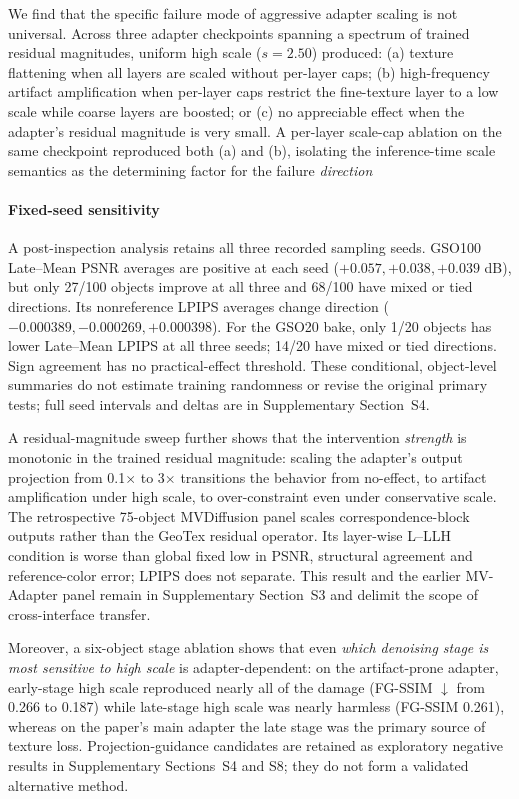 \documentclass[times,twocolumn,final]{elsarticle}
\providecommand{\DIFadd}[1]{{\protect\color{blue} \sf #1}} %
\providecommand{\DIFdel}[1]{{\protect\color{red} \scriptsize #1}} %
\providecommand{\DIFaddbegin}{} %
\providecommand{\DIFaddend}{} %
\providecommand{\DIFdelbegin}{} %
\providecommand{\DIFdelend}{} %
\begin{document}
\DIFdelbegin \DIFdel{We find that the specific failure mode of aggressive adapter scaling is not universal. Across three adapter checkpoints spanning a spectrum of trained residual magnitudes, uniform high scale ($s = 2.50$) produced: (a) texture flattening when all layers are scaled without per-layer caps; (b) high-frequency artifact amplification when per-layer caps restrict the fine-texture layer to a low scale while coarse layers are boosted; or (c) no appreciable effect when the adapter's residual magnitude is very small. A per-layer scale-cap ablation on the same checkpoint reproduced both (a) and (b), isolating the inference-time scale semantics as the determining factor for the failure \emph{direction}}\DIFdelend \DIFaddbegin \paragraph{Fixed-seed sensitivity}
\DIFadd{A post-inspection analysis retains all three recorded sampling seeds. GSO100 Late--Mean PSNR averages are positive at each seed ($+0.057,+0.038,+0.039$ dB), but only 27/100 objects improve at all three and 68/100 have mixed or tied directions. Its nonreference LPIPS averages change direction ($-0.000389,-0.000269,+0.000398$). For the GSO20 bake, only 1/20 objects has lower Late--Mean LPIPS at all three seeds; 14/20 have mixed or tied directions. Sign agreement has no practical-effect threshold. These conditional, object-level summaries do not estimate training randomness or revise the original primary tests; full seed intervals and deltas are in Supplementary Section~S4}\DIFaddend .

\DIFdelbegin \DIFdel{A residual-magnitude sweep further shows that the intervention \emph{strength} is monotonic in the trained residual magnitude: scaling the adapter's output projection from 0.1$\times$ to 3$\times$ transitions the behavior from no-effect, to artifact amplification under high scale, to over-constraint even under conservative scale.
}\DIFdelend \DIFaddbegin \DIFadd{The retrospective 75-object MVDiffusion panel scales correspondence-block outputs rather than the GeoTex residual operator. Its layer-wise L--LLH condition is worse than global fixed low in PSNR, structural agreement and reference-color error; LPIPS does not separate. This result and the earlier MV-Adapter panel remain in Supplementary Section~S3 and delimit the scope of cross-interface transfer.
}\DIFaddend

\DIFdelbegin \DIFdel{Moreover, a six-object stage ablation shows that even \emph{which denoising stage is most sensitive to high scale} is adapter-dependent: on the artifact-prone adapter, early-stage high scale reproduced nearly all of the damage (FG-SSIM $\downarrow$ from 0.266 to 0.187) while late-stage high scale was nearly harmless (FG-SSIM 0.261), whereas on the paper's main adapter the late stage was the primary source of texture loss. }\DIFdelend \DIFaddbegin \DIFadd{Projection-guidance candidates are retained as exploratory negative results in Supplementary Sections~S4 and S8; they do not form a validated alternative method.
}\DIFaddend
\end{document}
